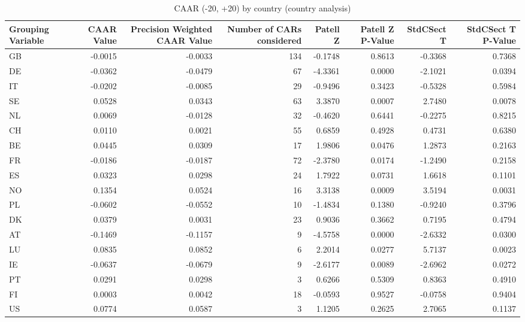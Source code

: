 \begin{table}
\caption{CAAR (-20, +20) by country (country analysis)}
\label{tab:country_caar}
\begin{tabular}{lrrrrrrr}
\toprule
Grouping Variable & CAAR Value & Precision Weighted CAAR Value & Number of CARs considered & Patell Z & Patell Z P-Value & StdCSect T & StdCSect T P-Value \\
\midrule
GB & -0.0015 & -0.0033 & 134 & -0.1748 & 0.8613 & -0.3368 & 0.7368 \\
DE & -0.0362 & -0.0479 & 67 & -4.3361 & 0.0000 & -2.1021 & 0.0394 \\
IT & -0.0202 & -0.0085 & 29 & -0.9496 & 0.3423 & -0.5328 & 0.5984 \\
SE & 0.0528 & 0.0343 & 63 & 3.3870 & 0.0007 & 2.7480 & 0.0078 \\
NL & 0.0069 & -0.0128 & 32 & -0.4620 & 0.6441 & -0.2275 & 0.8215 \\
CH & 0.0110 & 0.0021 & 55 & 0.6859 & 0.4928 & 0.4731 & 0.6380 \\
BE & 0.0445 & 0.0309 & 17 & 1.9806 & 0.0476 & 1.2873 & 0.2163 \\
FR & -0.0186 & -0.0187 & 72 & -2.3780 & 0.0174 & -1.2490 & 0.2158 \\
ES & 0.0323 & 0.0298 & 24 & 1.7922 & 0.0731 & 1.6618 & 0.1101 \\
NO & 0.1354 & 0.0524 & 16 & 3.3138 & 0.0009 & 3.5194 & 0.0031 \\
PL & -0.0602 & -0.0552 & 10 & -1.4834 & 0.1380 & -0.9240 & 0.3796 \\
DK & 0.0379 & 0.0031 & 23 & 0.9036 & 0.3662 & 0.7195 & 0.4794 \\
AT & -0.1469 & -0.1157 & 9 & -4.5758 & 0.0000 & -2.6332 & 0.0300 \\
LU & 0.0835 & 0.0852 & 6 & 2.2014 & 0.0277 & 5.7137 & 0.0023 \\
IE & -0.0637 & -0.0679 & 9 & -2.6177 & 0.0089 & -2.6962 & 0.0272 \\
PT & 0.0291 & 0.0298 & 3 & 0.6266 & 0.5309 & 0.8363 & 0.4910 \\
FI & 0.0003 & 0.0042 & 18 & -0.0593 & 0.9527 & -0.0758 & 0.9404 \\
US & 0.0774 & 0.0587 & 3 & 1.1205 & 0.2625 & 2.7065 & 0.1137 \\
\bottomrule
\end{tabular}
\end{table}
